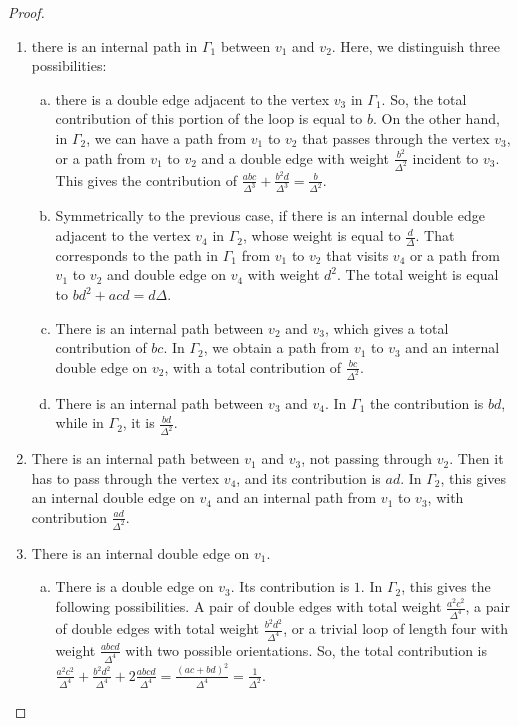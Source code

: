 \documentclass[12pt,a4paper]{article}
\theoremstyle{definition}
\begin{document}
\begin{proof}
\begin{enumerate}[label=\Roman*.]
    \begin{enumerate} [label=\arabic*.]
        \item there is an internal path in $\Gamma_1$ between $v_1$ and $v_2$. Here, we distinguish three possibilities:
        \begin{enumerate} [(a)]
            \item there is a double edge adjacent to the vertex $v_3$ in $\Gamma_1$. So, the total contribution of this portion of the loop is equal to $b$. On the other hand, in $\Gamma_2$, we can have a path from $v_1$ to $v_2$ that passes through the vertex $v_3$, or a path from $v_1$ to $v_2$ and a double edge with weight $\frac{b^2}{\Delta^2}$ incident to $v_3$. This gives the contribution of $\frac{abc}{\Delta^3} + \frac{b^2d}{\Delta^3} = \frac{b}{\Delta^2}$.
            \item Symmetrically to the previous case, if there is an internal double edge adjacent to the vertex $v_4$ in $\Gamma_2$, whose weight is equal to $\frac{d}{\Delta}$. That corresponds to the path in $\Gamma_1$ from $v_1$ to $v_2$ that visits $v_4$ or a path from $v_1$ to $v_2$ and double edge on $v_4$ with weight $d^2$. The total weight is equal to $bd^2 + acd = d \Delta$.
            \item There is an internal path between $v_2$ and $v_3$, which gives a total contribution of $bc$. In $\Gamma_2$, we obtain a path from $v_1$ to $v_3$ and an internal double edge on $v_2$, with a total contribution of $\frac{bc}{\Delta^2}$.
            \item There is an internal path between $v_3$ and $v_4$. In $\Gamma_1$ the contribution is $bd$, while in $\Gamma_2$, it is $\frac{bd}{\Delta^2}$.
        \end{enumerate}
        \item There is an internal path between $v_1$ and $v_3$, not passing through $v_2$. Then it has to pass through the vertex $v_4$, and its contribution is $ad$. In $\Gamma_2$, this gives an internal double edge on $v_4$ and an internal path from $v_1$ to $v_3$, with contribution $\frac{ad}{\Delta^2}$.
        \item There is an internal double edge on $v_1$.
        \begin{enumerate} [(a)]
            \item There is a double edge on $v_3$. Its contribution is $1$. In $\Gamma_2$, this gives the following possibilities. A pair of double edges with total weight $\frac{a^2c^2}{\Delta^4}$, a pair of double edges with total weight $\frac{b^2d^2}{\Delta^4}$, or a trivial loop of length four with weight $\frac{abcd}{\Delta^4}$ with two possible orientations. So, the total contribution is $\frac{a^2c^2}{\Delta^4} + \frac{b^2d^2}{\Delta^4} + 2\frac{abcd}{\Delta^4} = \frac{(ac + bd)^2}{\Delta^4} = \frac{1}{\Delta^2}$.

\end{enumerate}
\end{enumerate}
\end{enumerate}
\end{proof}
\end{document}
